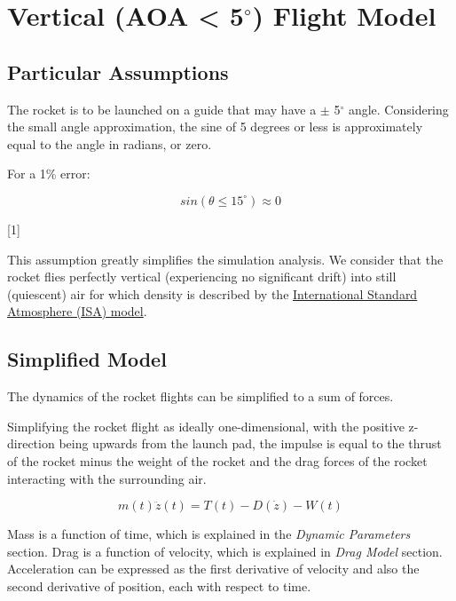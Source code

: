 \documentclass[]{article}
\begin{document}
\section{\texorpdfstring{Vertical (AOA \textless{} 5\(^\circ\)) Flight
Model}{Vertical (AOA \textless{} 5\^{}\textbackslash{}circ) Flight Model}}\label{vertical-aoa-5circ-flight-model}

\subsection{Particular Assumptions}\label{particular-assumptions}

The rocket is to be launched on a guide that may have a \(\pm\)
5\(^\circ\) angle. Considering the small angle approximation, the sine
of 5 degrees or less is approximately equal to the angle in radians, or
zero.

For a 1\% error:

\begin{equation} 
sin ( \theta \le 15^\circ ) \approx 0 
\end{equation}

{[}1{]}

This assumption greatly simplifies the simulation analysis. We consider
that the rocket flies perfectly vertical (experiencing no significant
drift) into still (quiescent) air for which density is described by the
\href{https://en.wikipedia.org/wiki/International_Standard_Atmosphere}{International
Standard Atmosphere (ISA) model}.

\subsection{Simplified Model}\label{simplified-model}

The dynamics of the rocket flights can be simplified to a sum of forces.

Simplifying the rocket flight as ideally one-dimensional, with the
positive z-direction being upwards from the launch pad, the impulse is
equal to the thrust of the rocket minus the weight of the rocket and the
drag forces of the rocket interacting with the surrounding air.

\begin{equation}
\label{eq_vertical_flight_eom}
m(t)\ddot{z}(t) = T(t) - D(\dot{z}) - W(t)
\end{equation}

Mass is a function of time, which is explained in the \emph{Dynamic
Parameters} section. Drag is a function of velocity, which is explained
in \emph{Drag Model} section. Acceleration can be expressed as the first
derivative of velocity and also the second derivative of position, each
with respect to time.
\end{document}

